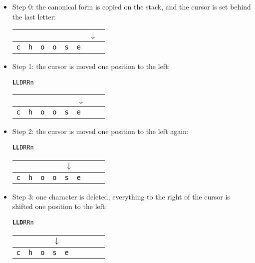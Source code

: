 \begin{itemize}
  \item Step 0: the canonical form is copied on the stack, and the cursor is set behind the last letter:
  
  \begin{center}
\begin{tabular}{|l|l|l|l|l|l|l|l}
\multicolumn{6}{l}{} & \multicolumn{2}{l}{$\downarrow$} \\
\hline
\verb+c+ & \verb+h+ & \verb+o+ & \verb+o+ & \verb+s+ & \verb+e+ & \verb+ + & \\
\hline
\end{tabular}
\end{center}

\bigskip
\item Step 1: the cursor is moved one position to the left:

\begin{center}
\texttt{\textbf{L}LDRRn}

\begin{tabular}{|l|l|l|l|l|l|l|l}
\multicolumn{5}{l}{} & \multicolumn{3}{l}{$\downarrow$} \\
\hline
\verb+c+ & \verb+h+ & \verb+o+ & \verb+o+ & \verb+s+ & \verb+e+ & \verb+ + & \\
\hline
\end{tabular}
\end{center}

\bigskip
\item Step 2: the cursor is moved one position to the left again:

\begin{center}
\texttt{\textbf{LL}DRRn}

\begin{tabular}{|l|l|l|l|l|l|l|l}
\multicolumn{4}{l}{} & \multicolumn{4}{l}{$\downarrow$} \\
\hline
\verb+c+ & \verb+h+ & \verb+o+ & \verb+o+ & \verb+s+ & \verb+e+ & \verb+ + & \\
\hline
\end{tabular}
\end{center}

\bigskip \item Step 3: one character is deleted; everything to the right of the
cursor is shifted one position to the left:

\begin{center}
\texttt{\textbf{LLD}RRn}

\begin{tabular}{|l|l|l|l|l|l|l|l}
\multicolumn{3}{l}{} & \multicolumn{5}{l}{$\downarrow$} \\
\hline
\verb+c+ & \verb+h+ & \verb+o+ & \verb+s+ & \verb+e+ & \verb+ + & \verb+ + & \\
\hline
\end{tabular}
\end{center}


\end{itemize}

